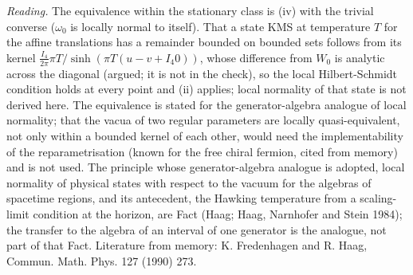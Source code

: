 \emph{Reading.} The equivalence within the stationary class is (iv) with the trivial converse ($\omega_{0}$ is locally normal to itself). That a state KMS at temperature $T$ for the affine translations has a remainder bounded on bounded sets follows from its kernel $\tfrac{I_{4}}{2\pi}\pi T/\sinh(\pi T(u - v + I_{4}0))$, whose difference from $W_{0}$ is analytic across the diagonal (argued; it is not in the check), so the local Hilbert-Schmidt condition holds at every point and (ii) applies; local normality of that state is not derived here. The equivalence is stated for the generator-algebra analogue of local normality; that the vacua of two regular parameters are locally quasi-equivalent, not only within a bounded kernel of each other, would need the implementability of the reparametrisation (known for the free chiral fermion, cited from memory) and is not used. The principle whose generator-algebra analogue is adopted, local normality of physical states with respect to the vacuum for the algebras of spacetime regions, and its antecedent, the Hawking temperature from a scaling-limit condition at the horizon, are Fact  (Haag; Haag, Narnhofer and Stein 1984); the transfer to the algebra of an interval of one generator is the analogue, not part of that Fact. Literature from memory: K. Fredenhagen and R. Haag, Commun. Math. Phys. 127 (1990) 273.
